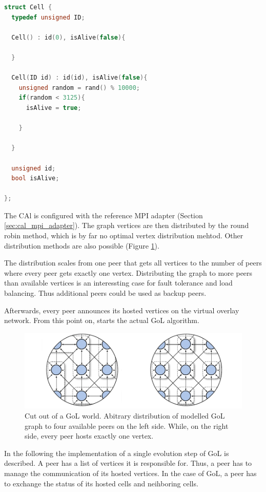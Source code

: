 \begin{lstlisting}[language=C++, label=lst:gol_cell]
struct Cell { 
  typedef unsigned ID; 

  Cell() : id(0), isAlive(false){ 
  
  }
  
  Cell(ID id) : id(id), isAlive(false){ 
    unsigned random = rand() % 10000;
    if(random < 3125){ 
      isAlive = true;

    }

  }
   
  unsigned id; 
  bool isAlive;

};
\end{lstlisting}

The CAl is configured with the reference MPI adapter (Section
\ref{sec:cal_mpi_adapter}).  The graph vertices are then distributed
by the round robin method, which is by far no optimal vertex
distribution mehtod. Other distribution methods are also possible
(Figure \ref{fig:gol_mapping}).


The distribution scales from one peer that gets all vertices to the
number of peers where every peer gets exactly one vertex. Distributing
the graph to more peers than available vertices is an interessting
case for fault tolerance and load balancing. Thus additional peers
could be used as backup peers. 

Afterwards, every peer announces its hosted vertices on the virtual
overlay network. From this point on, starts the actual GoL algorithm.

\begin{figure}[H]
  \centering
  \includegraphics[width=\textwidth]{graphics/40_gol_mapping}
  \caption{Cut out of a GoL world. Abitrary distribution of
    modelled GoL graph to four available peers on the left
    side. While, on the right side, every peer hosts exactly one
    vertex.}
  \label{fig:gol_mapping}
\end{figure}

In the following the implementation of a single evolution step of GoL
is described.  A peer has a list of vertices
it is responsible for. Thus, a peer has to manage the communication of
its hosted vertices. In the case of GoL, a peer has to exchange the status of
its hosted cells and neihboring cells.

